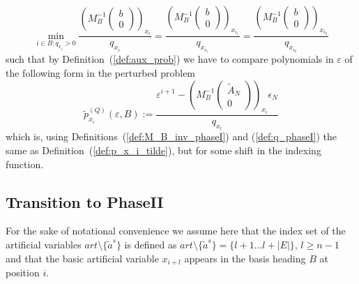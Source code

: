 \documentclass[a4paper]{article}
\begin{document}
\begin{equation*}
\min_{i \in B: q_{x_{i}}>0}
\frac{
\left(M_{B}^{-1}
  \left(\begin{array}{c}
          b \\
	  \hline
	  0
        \end{array}
  \right)
\right)_{x_{i}}
}{q_{x_{i}}}
=
\frac{
\left(M_{B}^{-1}
  \left(\begin{array}{c}
          b \\
	  \hline
	  0
        \end{array}
  \right)
\right)_{x_{i_{1}}}
}{q_{x_{i_{1}}}}
=
\frac{
\left(M_{B}^{-1}
  \left(\begin{array}{c}
          b \\
	  \hline
	  0
        \end{array}
  \right)
\right)_{x_{i_{2}}}
}{q_{x_{i_{2}}}}
\end{equation*}
such that by Definition~(\ref{def:aux_prob}) we have to compare polynomials
in $\varepsilon$ of the following form in the perturbed problem
\begin{equation}
\label{def:p_x_i_tilde_Q_1}
\tilde{p}_{x_{i}}^{(Q)}\left(\varepsilon, B\right) :=
\frac{
 \varepsilon^{i+1}
 -\left(M_{B}^{-1}
   \left(\begin{array}{c}
           \tilde{A}_{N} \\
	   \hline
	    0
         \end{array}
   \right)
  \right)_{x_{i}}
 \epsilon_{N}
}{q_{x_{i}}}
\end{equation}
which is, using Definitions~(\ref{def:M_B_inv_phaseI}) and
(\ref{def:q_phaseI}) the same as
Definition~(\ref{def:p_x_i_tilde}),
but for some shift in the indexing function.

 
\subsection{Transition to PhaseII}
For the sake of notational convenience we assume here that the index set of the
artificial variables $art\setminus \{\tilde{a}^{s}\}$ is defined as
$art\setminus \{\tilde{a}^{s}\}=\{l+1 \ldots l+\left|E\right| \}$,
$l \geq n-1$ and that the basic artificial variable $x_{i+l}$ appears in the
basis heading $B$ at position $i$.
\end{document}
